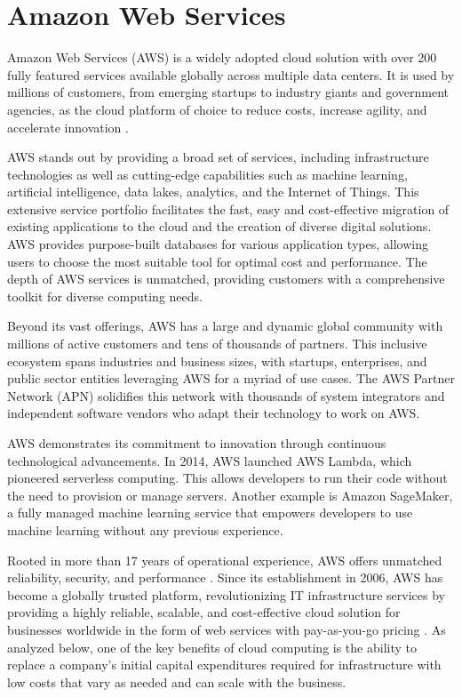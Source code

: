 \section{Amazon Web Services}

Amazon Web Services (AWS) is a widely adopted cloud solution with over 200 fully featured services available globally across multiple data centers. It is used by millions of customers, from emerging startups to industry giants and government agencies, as the cloud platform of choice to reduce costs, increase agility, and accelerate innovation \cite{EuAmazonWebServices}.

AWS stands out by providing a broad set of services, including infrastructure technologies as well as cutting-edge capabilities such as machine learning, artificial intelligence, data lakes, analytics, and the Internet of Things. This extensive service portfolio facilitates the fast, easy and cost-effective migration of existing applications to the cloud and the creation of diverse digital solutions. AWS provides purpose-built databases for various application types, allowing users to choose the most suitable tool for optimal cost and performance. The depth of AWS services is unmatched, providing customers with a comprehensive toolkit for diverse computing needs.

Beyond its vast offerings, AWS has a large and dynamic global community with millions of active customers and tens of thousands of partners. This inclusive ecosystem spans industries and business sizes, with startups, enterprises, and public sector entities leveraging AWS for a myriad of use cases. The AWS Partner Network (APN) solidifies this network with thousands of system integrators and independent software vendors who adapt their technology to work on AWS.

AWS demonstrates its commitment to innovation through continuous technological advancements. In 2014, AWS launched AWS Lambda, which pioneered serverless computing. This allows developers to run their code without the need to provision or manage servers. Another example is Amazon SageMaker, a fully managed machine learning service that empowers developers to use machine learning without any previous experience.

Rooted in more than 17 years of operational experience, AWS offers unmatched reliability, security, and performance \cite{WhatIsAWS}. Since its establishment in 2006, AWS has become a globally trusted platform, revolutionizing IT infrastructure services by providing a highly reliable, scalable, and cost-effective cloud solution for businesses worldwide in the form of web services with pay-as-you-go pricing \cite{AboutAWS}. As analyzed below, one of the key benefits of cloud computing is the ability to replace a company's initial capital expenditures required for infrastructure with low costs that vary as needed and can scale with the business.

